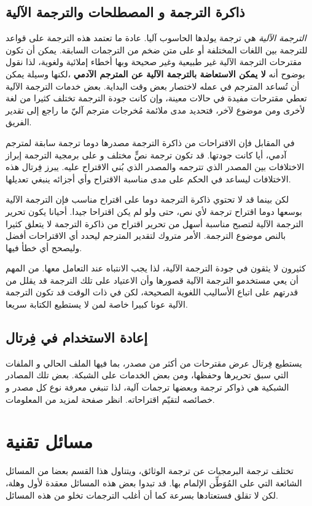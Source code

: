\section{ذاكرة الترجمة و المصطلحات والترجمة الآلية}
{\it الترجمة الآلية} هي ترجمة يولدها الحاسوب آليا. عادة ما تعتمد هذه
الترجمة على قواعد للترجمة بين اللغات المختلفة أو على متن ضخم من
الترجمات السابقة. يمكن أن تكون مقترحات الترجمة الآلية غير طبيعية وغير
صحيحة وبها أخطاء إملائية ولغوية، لذا نقول بوضوح أنه {\bf لا يمكن
الاستعاضة بالترجمة الآلية عن المترجم الآدمي} ،لكنها وسيلة يمكن أن
تُساعد المترجم في عمله لاختصار بعض وقت البداية. بعض خدمات الترجمة
الآلية تعطي مقترحات مفيدة في حالات معينة، وإن كانت جودة الترجمة تختلف
كثيرا من لغة لأخرى ومن موضوع لآخر، فتحديد مدى ملائمة مُخرجات مترجم آليّ
ما راجع إلى تقدير الفريق.

في المقابل فإن الاقتراحات من ذاكرة الترجمة مصدرها دوما ترجمة سابقة
لمترجم آدمي، أيا كانت جودتها. قد تكون ترجمة نصٍّ مختلف و على برمجية
الترجمة إبراز الاختلافات بين المصدر الذي تترجمه والمصدر الذي بُني
الاقتراح عليه. يبرز فِرتال هذه الاختلافات ليساعد في الحكم على مدى
مناسبة الاقتراح وأي أجزائه ينبغي تعديلها.

لكن بينما قد لا تحتوي ذاكرة الترجمة دوما على اقتراح مناسب فإن الترجمة
الآلية بوسعها دوما اقتراح ترجمة لأي نص، حتى ولو لم يكن اقتراحا جيدا.
أحيانا يكون تحرير الترجمة الآلية لتصبح مناسبة أسهل من تحرير اقتراح من
ذاكرة الترجمة لا يتعلق كثيرا بالنص موضوع الترجمة. الأمر متروك لتقدير
المترجم ليحدد أي الاقتراحات أفضل وليصحح أي خطأ فيها.

كثيرون لا يثقون في جودة الترجمة الآلية، لذا يجب الانتباه عند التعامل
معها. من المهم أن يعي مستخدمو الترجمة الآلية قصورها وأن الاعتياد على
تلك الترجمة قد يقلل من قدرتهم على اتباع الأساليب اللغوية الصحيحة، لكن
في ذات الوقت قد تكون الترجمة الآلية عونا كبيرا خاصة لمن لا يستطيع
الكتابة سريعا.

\section{إعادة الاستخدام في فِرتال}
يستطيع فِرتال عرض مقترحات من أكثر من مصدر، بما فيها الملف الحالي و
الملفات التي سبق تحريرها وحفظها، ومن بعض الخدمات على الشبكة. بعض تلك
المصادر الشبكية هي ذواكر ترجمة وبعضها ترجمات آلية، لذا تنبغي معرفة نوع
كل مصدر و خصائصه لتقيّم اقتراحاته. انظر صفحة
 لمزيد من المعلومات.

\chapter{مسائل تقنية}
تختلف ترجمة البرمجيات عن ترجمة
الوثائق، ويتناول هذا القسم بعضا من المسائل الشائعة التي على المُوَطِّن
الإلمام بها. قد تبدوا بعض هذه المسائل معقدة لأول وهلة، لكن لا تقلق
فستعتادها بسرعة كما أن أغلب الترجمات تخلو من هذه المسائل.

